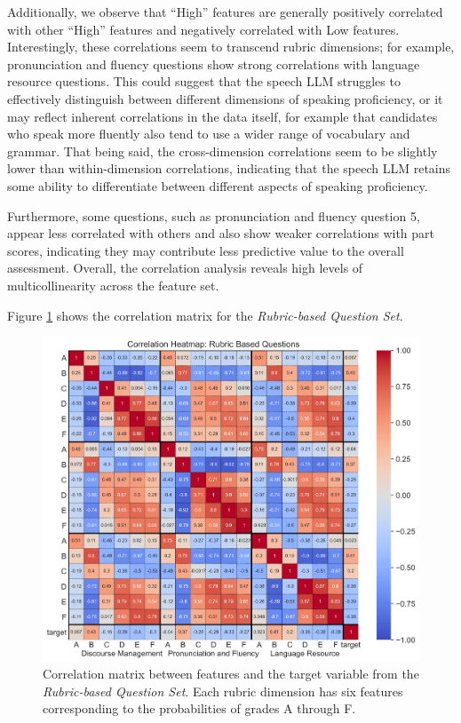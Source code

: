 \documentclass{report}
\begin{document}
Additionally, we observe that ``High'' features are generally positively correlated with other ``High'' features and negatively correlated with Low features. Interestingly, these correlations seem to transcend rubric dimensions; for example, pronunciation and fluency questions show strong correlations with language resource questions. This could suggest that the speech LLM struggles to effectively distinguish between different dimensions of speaking proficiency, or it may reflect inherent correlations in the data itself, for example that candidates who speak more fluently also tend to use a wider range of vocabulary and grammar. That being said, the cross-dimension correlations seem to be slightly lower than within-dimension correlations, indicating that the speech LLM retains some ability to differentiate between different aspects of speaking proficiency.

Furthermore, some questions, such as pronunciation and fluency question 5, appear less correlated with others and also show weaker correlations with part scores, indicating they may contribute less predictive value to the overall assessment. Overall, the correlation analysis reveals high levels of multicollinearity across the feature set.

Figure \ref{fig:correlation_matrix_rubric} shows the correlation matrix for the \emph{Rubric-based Question Set}.

\begin{figure}[h]
  \centering
  \includegraphics[width=1\linewidth]{images/correlation_matrix_rubric.png}
  \caption{Correlation matrix between features and the target variable from the \emph{Rubric-based Question Set}. Each rubric dimension has six features corresponding to the probabilities of grades A through F.}
  \label{fig:correlation_matrix_rubric}
\end{figure}
\end{document}
